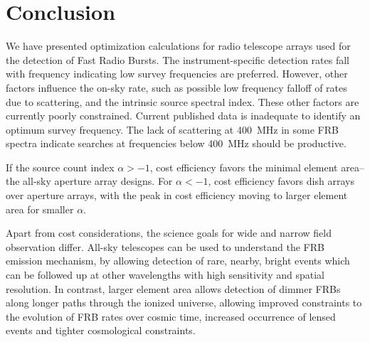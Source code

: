\documentclass[fleqn,usenatbib]{mnras}
\begin{document}
\section{Conclusion}

We have presented optimization calculations for radio telescope arrays used for the detection of Fast Radio Bursts.  The instrument-specific detection rates fall with frequency indicating low survey frequencies are preferred. However, other factors influence the on-sky rate, such as possible low frequency falloff of rates due to scattering, and the intrinsic source spectral index. These other factors are currently poorly constrained. Current published data is inadequate to identify an optimum survey frequency. The lack of scattering at 400~MHz in some FRB spectra indicate searches at frequencies below 400~MHz should be productive.

 
If the source count index $\alpha > -1$, cost efficiency favors the minimal element area--the all-sky aperture array designs.  For $\alpha < -1$, cost efficiency favors dish arrays over aperture arrays, with the peak in cost efficiency moving to larger element area for smaller $\alpha$. 

Apart from cost considerations, the science goals for wide and narrow field observation differ.
All-sky telescopes can be used to understand the FRB emission mechanism, by allowing detection of rare, nearby, bright events which can be followed up at other wavelengths with high sensitivity and spatial resolution. In contrast, larger element area allows detection of dimmer FRBs along longer paths through the ionized universe, allowing improved constraints to the evolution of FRB rates over cosmic time, increased occurrence of lensed events and tighter cosmological constraints.





 



\label{lastpage}
\end{document}
